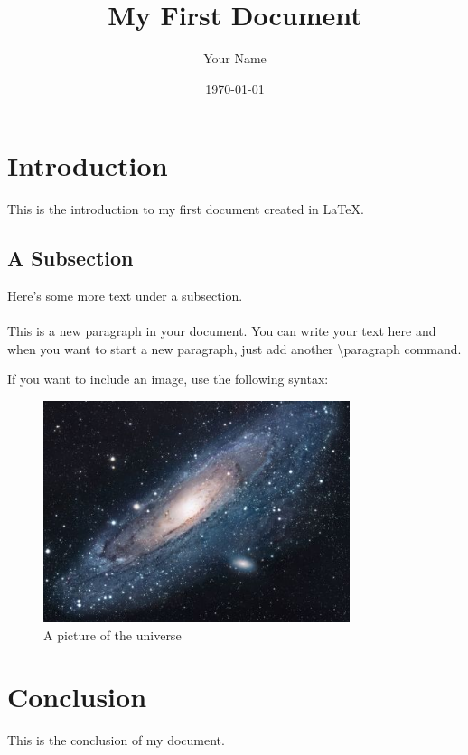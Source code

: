 \documentclass{article}
\title{My First Document}
\author{Your Name}
\date{\today}
\begin{document}
\maketitle

\section{Introduction}
This is the introduction to my first document created in \LaTeX.

\subsection{A Subsection}
Here's some more text under a subsection.

\paragraph{}
This is a new paragraph in your document. You can write your text here and when you want to start a new paragraph, just add another \textbackslash{}paragraph command.

If you want to include an image, use the following syntax:
\begin{figure}[ht]
\centering
\includegraphics[width=0.8\textwidth]{universe.jpg}
\caption{A picture of the universe}
\label{fig:universe}
\end{figure}

\section{Conclusion}
This is the conclusion of my document.
\end{document}
